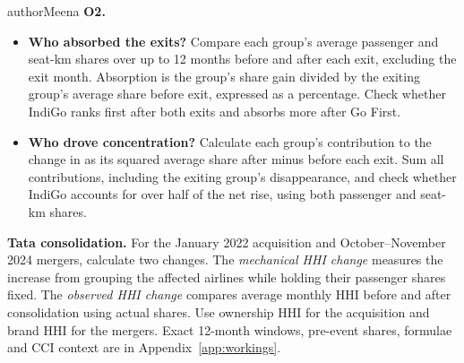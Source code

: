 \begin{authorcontribution}{authorMeena}
\label{sec:method-o2}
\textbf{O2.}
\begin{itemize}[leftmargin=2em]
	\item \textbf{Who absorbed the exits?} Compare each group's average passenger and seat-km shares over up to 12 months before and after each exit, excluding the exit month. Absorption is the group's share gain divided by the exiting group's average share before exit, expressed as a percentage. Check whether IndiGo ranks first after both exits and absorbs more after Go First.
	\item \textbf{Who drove concentration?} Calculate each group's contribution to the change in \HHI{} as its squared average share after minus before each exit. Sum all contributions, including the exiting group's disappearance, and check whether IndiGo accounts for over half of the net rise, using both passenger and seat-km shares.
\end{itemize}
\textbf{Tata consolidation.} For the January 2022 acquisition and October--November 2024 mergers, calculate two changes. The \emph{mechanical HHI change} measures the increase from grouping the affected airlines while holding their passenger shares fixed. The \emph{observed HHI change} compares average monthly HHI before and after consolidation using actual shares. Use ownership HHI for the acquisition and brand HHI for the mergers. Exact 12-month windows, pre-event shares, formulae and CCI context \parencite{cci2023vistara} are in Appendix~\ref{app:workings}.
\end{authorcontribution}
